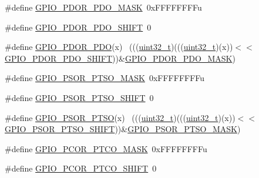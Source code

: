 \begin{DoxyCompactItemize}
\item 
\#define \hyperlink{group___g_p_i_o___register___masks_gafd2a8274691295293b3cabfe86089801}{G\+P\+I\+O\+\_\+\+P\+D\+O\+R\+\_\+\+P\+D\+O\+\_\+\+M\+A\+SK}~0x\+F\+F\+F\+F\+F\+F\+F\+Fu
\item 
\#define \hyperlink{group___g_p_i_o___register___masks_ga495b5f1e63de863534ce0c5f25f137ab}{G\+P\+I\+O\+\_\+\+P\+D\+O\+R\+\_\+\+P\+D\+O\+\_\+\+S\+H\+I\+FT}~0
\item 
\#define \hyperlink{group___g_p_i_o___register___masks_ga79d6ac6995e51c108cc38b287e688f0d}{G\+P\+I\+O\+\_\+\+P\+D\+O\+R\+\_\+\+P\+DO}(x)                                              ~(((\hyperlink{_p_e___types_8h_a33594304e786b158f3fb30289278f5af}{uint32\+\_\+t})(((\hyperlink{_p_e___types_8h_a33594304e786b158f3fb30289278f5af}{uint32\+\_\+t})(x))$<$$<$\hyperlink{group___g_p_i_o___register___masks_ga495b5f1e63de863534ce0c5f25f137ab}{G\+P\+I\+O\+\_\+\+P\+D\+O\+R\+\_\+\+P\+D\+O\+\_\+\+S\+H\+I\+FT}))\&\hyperlink{group___g_p_i_o___register___masks_gafd2a8274691295293b3cabfe86089801}{G\+P\+I\+O\+\_\+\+P\+D\+O\+R\+\_\+\+P\+D\+O\+\_\+\+M\+A\+SK})
\item 
\#define \hyperlink{group___g_p_i_o___register___masks_gaa8a48e38ef70ff1ba3bbcbf31b891da4}{G\+P\+I\+O\+\_\+\+P\+S\+O\+R\+\_\+\+P\+T\+S\+O\+\_\+\+M\+A\+SK}~0x\+F\+F\+F\+F\+F\+F\+F\+Fu
\item 
\#define \hyperlink{group___g_p_i_o___register___masks_ga5a962b85e07477e26afe639c7ca478cb}{G\+P\+I\+O\+\_\+\+P\+S\+O\+R\+\_\+\+P\+T\+S\+O\+\_\+\+S\+H\+I\+FT}~0
\item 
\#define \hyperlink{group___g_p_i_o___register___masks_gafea75a81df86bdc27b57b045f71a7866}{G\+P\+I\+O\+\_\+\+P\+S\+O\+R\+\_\+\+P\+T\+SO}(x)                                            ~(((\hyperlink{_p_e___types_8h_a33594304e786b158f3fb30289278f5af}{uint32\+\_\+t})(((\hyperlink{_p_e___types_8h_a33594304e786b158f3fb30289278f5af}{uint32\+\_\+t})(x))$<$$<$\hyperlink{group___g_p_i_o___register___masks_ga5a962b85e07477e26afe639c7ca478cb}{G\+P\+I\+O\+\_\+\+P\+S\+O\+R\+\_\+\+P\+T\+S\+O\+\_\+\+S\+H\+I\+FT}))\&\hyperlink{group___g_p_i_o___register___masks_gaa8a48e38ef70ff1ba3bbcbf31b891da4}{G\+P\+I\+O\+\_\+\+P\+S\+O\+R\+\_\+\+P\+T\+S\+O\+\_\+\+M\+A\+SK})
\item 
\#define \hyperlink{group___g_p_i_o___register___masks_ga0b8378768ee61ea2c685a1687c90fa03}{G\+P\+I\+O\+\_\+\+P\+C\+O\+R\+\_\+\+P\+T\+C\+O\+\_\+\+M\+A\+SK}~0x\+F\+F\+F\+F\+F\+F\+F\+Fu
\item 
\#define \hyperlink{group___g_p_i_o___register___masks_ga5c9203b830cbd86cd8d0189872b5c772}{G\+P\+I\+O\+\_\+\+P\+C\+O\+R\+\_\+\+P\+T\+C\+O\+\_\+\+S\+H\+I\+FT}~0

\end{DoxyCompactItemize}
